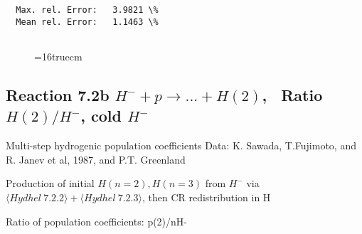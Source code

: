 \documentclass[12pt,dvipdfmx]{article}
\begin{document}
\begin{small}
\begin{verbatim}
  Max. rel. Error:   3.9821 \%
  Mean rel. Error:   1.1463 \%


\end{verbatim}\end{small}
\begin{figure} \label{7.2a}
\epsfxsize=16truecm
\end{figure}
\newpage


\subsection{
Reaction 7.2b $ H^- + p \rightarrow ...+ H(2) $, \   Ratio $H(2)/H^- $, cold $H^-$
}
 Multi-step hydrogenic population coefficients
 Data: K. Sawada, T.Fujimoto, \cite{kn:Sawada} and R. Janev et al, 1987, and P.T. Greenland

Production of initial $H(n=2), H(n=3)$ from $H^-$ via $ \langle Hydhel~ 7.2.2\rangle + \langle Hydhel~ 7.2.3\rangle$,
 then CR redistribution in H

 Ratio of population coefficients: p(2)/nH-
\end{document}

